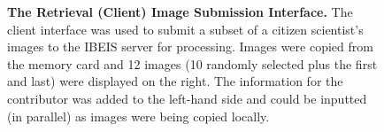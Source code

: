 \begin{figure}[t]%
    \centering
        \caption[The Retrieval (Client) Image Submission Interface]{\textbf{The Retrieval (Client) Image Submission Interface.}  The client interface was used to submit a subset of a citizen scientist's images to the IBEIS server for processing.  Images were copied from the memory card and 12 images (10 randomly selected plus the first and last) were displayed on the right.  The information for the contributor was added to the left-hand side and could be inputted (in parallel) as images were being copied locally.}
        \label{fig:client-images}
\end{figure}

